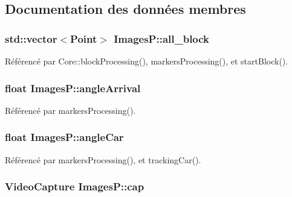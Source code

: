 \subsection{Documentation des données membres}
\hypertarget{classImagesP_ab9e279526694a7ce421cfa11b9309ed1}{
\subsubsection[{all\-\_\-block}]{\setlength{\rightskip}{0pt plus 5cm}std\-::vector$<$Point$>$ Images\-P\-::all\-\_\-block}}\label{classImagesP_ab9e279526694a7ce421cfa11b9309ed1}


Référencé par Core\-::block\-Processing(), markers\-Processing(), et start\-Block().

\hypertarget{classImagesP_a408c61aeceb9175481adb2daca707a48}{
\subsubsection[{angle\-Arrival}]{\setlength{\rightskip}{0pt plus 5cm}float Images\-P\-::angle\-Arrival}}\label{classImagesP_a408c61aeceb9175481adb2daca707a48}


Référencé par markers\-Processing().

\hypertarget{classImagesP_a39c69bdd9469b4b8a2c9666e27afa7b0}{
\subsubsection[{angle\-Car}]{\setlength{\rightskip}{0pt plus 5cm}float Images\-P\-::angle\-Car}}\label{classImagesP_a39c69bdd9469b4b8a2c9666e27afa7b0}


Référencé par markers\-Processing(), et tracking\-Car().

\hypertarget{classImagesP_a143a67baa23fdc4b1c28beda0bd964f5}{
\subsubsection[{cap}]{\setlength{\rightskip}{0pt plus 5cm}Video\-Capture Images\-P\-::cap\hspace{0.3cm}{\ttfamily [private]}}}\label{classImagesP_a143a67baa23fdc4b1c28beda0bd964f5}


